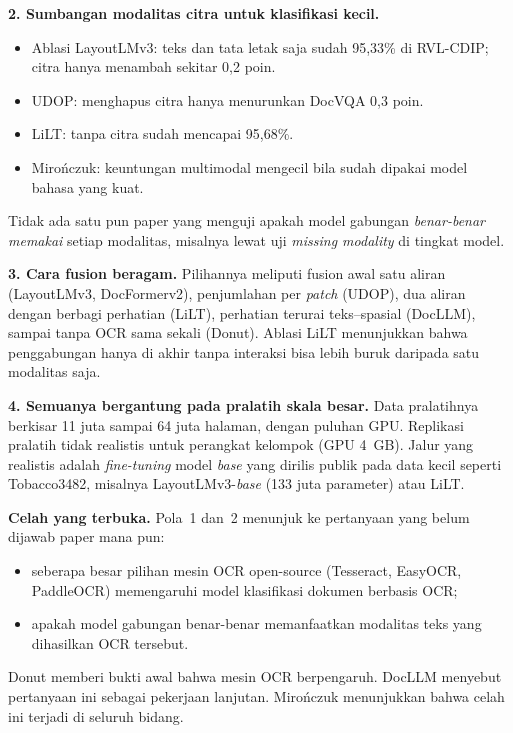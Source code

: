 \textbf{2. Sumbangan modalitas citra untuk klasifikasi kecil.}
\begin{itemize}
  \item Ablasi LayoutLMv3: teks dan tata letak saja sudah 95,33\% di RVL-CDIP; citra hanya
  menambah sekitar 0,2 poin.
  \item UDOP: menghapus citra hanya menurunkan DocVQA 0,3 poin.
  \item LiLT: tanpa citra sudah mencapai 95,68\%.
  \item Mirończuk: keuntungan multimodal mengecil bila sudah dipakai model bahasa yang
  kuat.
\end{itemize}
Tidak ada satu pun paper yang menguji apakah model gabungan \emph{benar-benar memakai}
setiap modalitas, misalnya lewat uji \textit{missing modality} di tingkat model.

\textbf{3. Cara fusion beragam.} Pilihannya meliputi fusion awal satu aliran (LayoutLMv3,
DocFormerv2), penjumlahan per \textit{patch} (UDOP), dua aliran dengan berbagi perhatian
(LiLT), perhatian terurai teks--spasial (DocLLM), sampai tanpa OCR sama sekali (Donut).
Ablasi LiLT menunjukkan bahwa penggabungan hanya di akhir tanpa interaksi bisa lebih buruk
daripada satu modalitas saja.

\textbf{4. Semuanya bergantung pada pralatih skala besar.} Data pralatihnya berkisar 11 juta
sampai 64 juta halaman, dengan puluhan GPU. Replikasi pralatih tidak realistis untuk
perangkat kelompok (GPU 4~GB). Jalur yang realistis adalah \textit{fine-tuning} model
\textit{base} yang dirilis publik pada data kecil seperti Tobacco3482, misalnya
LayoutLMv3-\textit{base} (133 juta parameter) atau LiLT.

\textbf{Celah yang terbuka.} Pola~1 dan~2 menunjuk ke pertanyaan yang belum dijawab paper
mana pun:
\begin{itemize}
  \item seberapa besar pilihan mesin OCR open-source (Tesseract, EasyOCR, PaddleOCR)
  memengaruhi model klasifikasi dokumen berbasis OCR;
  \item apakah model gabungan benar-benar memanfaatkan modalitas teks yang dihasilkan OCR
  tersebut.
\end{itemize}
Donut memberi bukti awal bahwa mesin OCR berpengaruh. DocLLM menyebut pertanyaan ini
sebagai pekerjaan lanjutan. Mirończuk menunjukkan bahwa celah ini terjadi di seluruh
bidang.
